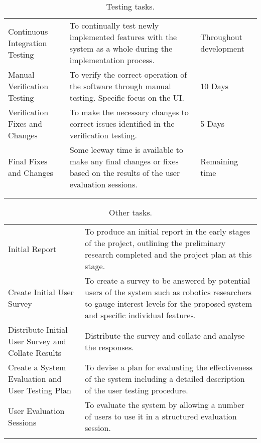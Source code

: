 \begin{longtable}{ >{\raggedright}p{5cm}>{\raggedright}p{6cm}p{3cm} }
	\caption{Testing tasks.}\\
	\toprule
	\tabhead{Task} & \tabhead{Objective} & \tabhead{Approximate Time} \\
	\midrule
	
Continuous Integration Testing & To continually test newly implemented features with the system as a whole during the implementation process. & Throughout development
\\
Manual Verification Testing & To verify the correct operation of the software through manual testing. Specific focus on the UI. & 10 Days
\\
Verification Fixes and Changes & To make the necessary changes to correct issues identified in the verification testing. & 5 Days
\\ 
Final Fixes and Changes & Some leeway time is available to make any final changes or fixes based on the results of the user evaluation sessions. & Remaining time 
\\ 
	\bottomrule\\
	\label{tab:TestingTasks}
\end{longtable}

\clearpage
\begin{longtable}{ p{5cm}p{9cm} }
	\caption{Other tasks.}\\
	\toprule
	\tabhead{Task} & \tabhead{Objective} \\
	\midrule
	
Initial Report & To produce an initial report in the early stages of the project, outlining the preliminary research completed and the project plan at this stage.
\\
Create Initial User Survey & To create a survey to be answered by potential users of the system such as robotics researchers to gauge interest levels for the proposed system and specific individual features.
\\
Distribute Initial User Survey and Collate Results & Distribute the survey and collate and analyse the responses.
\\
Create a System Evaluation and User Testing Plan & To devise a plan for evaluating the effectiveness of the system including a detailed description of the user testing procedure.
\\
User Evaluation Sessions & To evaluate the system by allowing a number of users to use it in a structured evaluation session.
\\
	\bottomrule
	\label{tab:OtherTasks}
\end{longtable}

